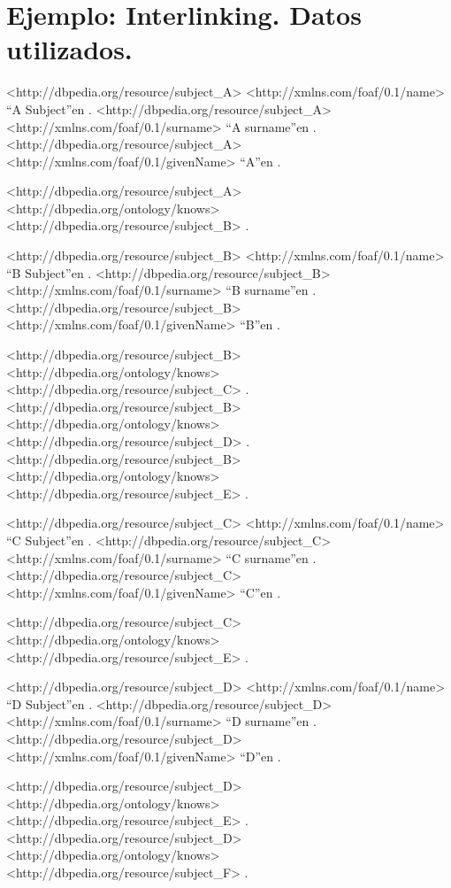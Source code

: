 \chapter{Ejemplo: Interlinking. Datos utilizados.}
\label{ex:sc}

\begin{listing}[
  language = XML,
  numbers=left,
  numberstyle=\tiny,
  stepnumber=5,
  numbersep=5pt,
  frame=single,
  caption  = {Datos utilizados para el ejemplo SchemaCompleteness},
  label    = ex:scdata]
<http://dbpedia.org/resource/subject_A> <http://xmlns.com/foaf/0.1/name> ``A Subject''en .
<http://dbpedia.org/resource/subject_A> <http://xmlns.com/foaf/0.1/surname> ``A surname''en .
<http://dbpedia.org/resource/subject_A> <http://xmlns.com/foaf/0.1/givenName> ``A''en .

<http://dbpedia.org/resource/subject_A> <http://dbpedia.org/ontology/knows> <http://dbpedia.org/resource/subject_B> .

<http://dbpedia.org/resource/subject_B> <http://xmlns.com/foaf/0.1/name> ``B Subject''en .
<http://dbpedia.org/resource/subject_B> <http://xmlns.com/foaf/0.1/surname> ``B surname''en .
<http://dbpedia.org/resource/subject_B> <http://xmlns.com/foaf/0.1/givenName> ``B''en .

<http://dbpedia.org/resource/subject_B> <http://dbpedia.org/ontology/knows> <http://dbpedia.org/resource/subject_C> .
<http://dbpedia.org/resource/subject_B> <http://dbpedia.org/ontology/knows> <http://dbpedia.org/resource/subject_D> .
<http://dbpedia.org/resource/subject_B> <http://dbpedia.org/ontology/knows> <http://dbpedia.org/resource/subject_E> .

<http://dbpedia.org/resource/subject_C> <http://xmlns.com/foaf/0.1/name> ``C Subject''en .
<http://dbpedia.org/resource/subject_C> <http://xmlns.com/foaf/0.1/surname> ``C surname''en .
<http://dbpedia.org/resource/subject_C> <http://xmlns.com/foaf/0.1/givenName> ``C''en .

<http://dbpedia.org/resource/subject_C> <http://dbpedia.org/ontology/knows> <http://dbpedia.org/resource/subject_E> .

<http://dbpedia.org/resource/subject_D> <http://xmlns.com/foaf/0.1/name> ``D Subject''en .
<http://dbpedia.org/resource/subject_D> <http://xmlns.com/foaf/0.1/surname> ``D surname''en .
<http://dbpedia.org/resource/subject_D> <http://xmlns.com/foaf/0.1/givenName> ``D''en .

<http://dbpedia.org/resource/subject_D> <http://dbpedia.org/ontology/knows> <http://dbpedia.org/resource/subject_E> .
<http://dbpedia.org/resource/subject_D> <http://dbpedia.org/ontology/knows> <http://dbpedia.org/resource/subject_F> .


\end{listing}
